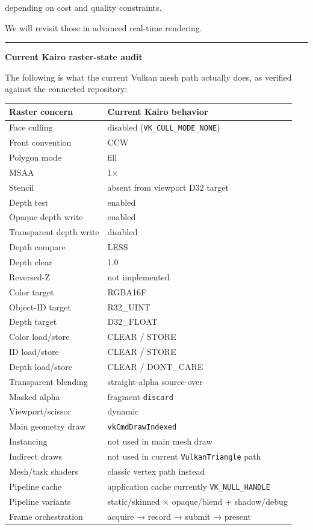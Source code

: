 depending on cost and quality constraints.

We will revisit those in advanced real-time rendering.

\begin{center}\rule{0.5\linewidth}{0.5pt}\end{center}

\textbf{Current Kairo raster-state audit}

The following is what the current Vulkan mesh path actually does, as verified against the connected repository:

{\def\LTcaptype{none} %
\begin{longtable}[]{@{}ll@{}}
\toprule\noalign{}
Raster concern & Current Kairo behavior \\
\midrule\noalign{}
\endhead
\bottomrule\noalign{}
\endlastfoot
Face culling & disabled (\texttt{VK\_CULL\_MODE\_NONE}) \\
Front convention & CCW \\
Polygon mode & fill \\
MSAA & 1× \\
Stencil & absent from viewport D32 target \\
Depth test & enabled \\
Opaque depth write & enabled \\
Transparent depth write & disabled \\
Depth compare & LESS \\
Depth clear & 1.0 \\
Reversed-Z & not implemented \\
Color target & RGBA16F \\
Object-ID target & R32\_UINT \\
Depth target & D32\_FLOAT \\
Color load/store & CLEAR / STORE \\
ID load/store & CLEAR / STORE \\
Depth load/store & CLEAR / DONT\_CARE \\
Transparent blending & straight-alpha source-over \\
Masked alpha & fragment \texttt{discard} \\
Viewport/scissor & dynamic \\
Main geometry draw & \texttt{vkCmdDrawIndexed} \\
Instancing & not used in main mesh draw \\
Indirect draws & not used in current \texttt{VulkanTriangle} path \\
Mesh/task shaders & classic vertex path instead \\
Pipeline cache & application cache currently \texttt{VK\_NULL\_HANDLE} \\
Pipeline variants & static/skinned × opaque/blend + shadow/debug \\
Frame orchestration & acquire → record → submit → present \\
\end{longtable}
}

